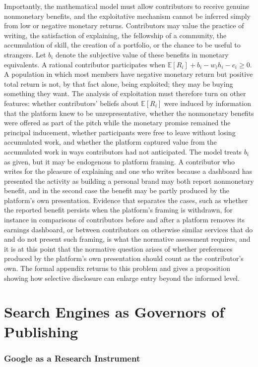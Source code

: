 \documentclass[11pt]{article}
\theoremstyle{remark}
\begin{document}
Importantly, the mathematical model must allow contributors to receive genuine nonmonetary benefits, and the exploitative mechanism cannot be inferred simply from low or negative monetary returns. Contributors may value the practice of writing, the satisfaction of explaining, the fellowship of a community, the accumulation of skill, the creation of a portfolio, or the chance to be useful to strangers. Let $b_i$ denote the subjective value of these benefits in monetary equivalents. A rational contributor participates when $\mathbb{E}[R_i] + b_i - w_i h_i - c_i \ge 0$. A population in which most members have negative monetary return but positive total return is not, by that fact alone, being exploited; they may be buying something they want. The analysis of exploitation must therefore turn on other features: whether contributors' beliefs about $\mathbb{E}[R_i]$ were induced by information that the platform knew to be unrepresentative, whether the nonmonetary benefits were offered as part of the pitch while the monetary promise remained the principal inducement, whether participants were free to leave without losing accumulated work, and whether the platform captured value from the accumulated work in ways contributors had not anticipated. The model treats $b_i$ as given, but it may be endogenous to platform framing. A contributor who writes for the pleasure of explaining and one who writes because a dashboard has presented the activity as building a personal brand may both report nonmonetary benefit, and in the second case the benefit may be partly produced by the platform's own presentation. Evidence that separates the cases, such as whether the reported benefit persists when the platform's framing is withdrawn, for instance in comparisons of contributors before and after a platform removes its earnings dashboard, or between contributors on otherwise similar services that do and do not present such framing, is what the normative assessment requires, and it is at this point that the normative question arises of whether preferences produced by the platform's own presentation should count as the contributor's own. The formal appendix returns to this problem and gives a proposition showing how selective disclosure can enlarge entry beyond the informed level.

\part{Search Engines as Governors of Publishing}

\section{Google as a Research Instrument}
\end{document}
